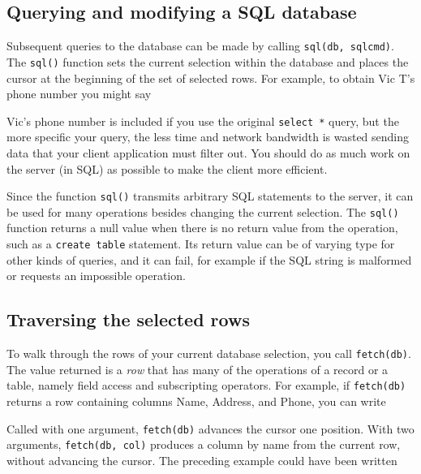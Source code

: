 \subsection*{Querying and modifying a SQL database}

Subsequent queries to the database can be made by calling
\texttt{sql(db, sqlcmd)}. The \texttt{sql()} function sets
the current selection within the database and places the cursor at the
beginning of the set of selected rows. For example, to obtain Vic
T's phone number you might say


Vic's phone number is included if you use the original
\texttt{select *} query, but the more specific your query, the less
time and network bandwidth is wasted sending data that your client
application must filter out. You should do as much work on the server
(in SQL) as possible to make the client more efficient.

Since the function \texttt{sql()} transmits arbitrary SQL statements to
the server, it can be used for many operations besides changing the
current selection. The \texttt{sql()} function returns a null value
when there is no return value from the operation, such as a
\texttt{create table} statement. Its return value can be of varying
type for other kinds of queries, and it can fail, for example if the
SQL string is malformed or requests an impossible operation.

\subsection*{Traversing the selected rows}

To walk through the rows of your current database selection, you call
\texttt{fetch(db)}. The value returned is a
\textit{row} that has many of the operations of a record or a table,
namely field access and subscripting operators. For example, if
\texttt{fetch(db)} returns a row containing columns Name, Address, and
Phone, you can write


\noindent
Called with one argument, \texttt{fetch(db)} advances the cursor
one position. With two arguments, \texttt{fetch(db, col)} produces a
column by name from the current row, without advancing the cursor.
The preceding example could have been written

